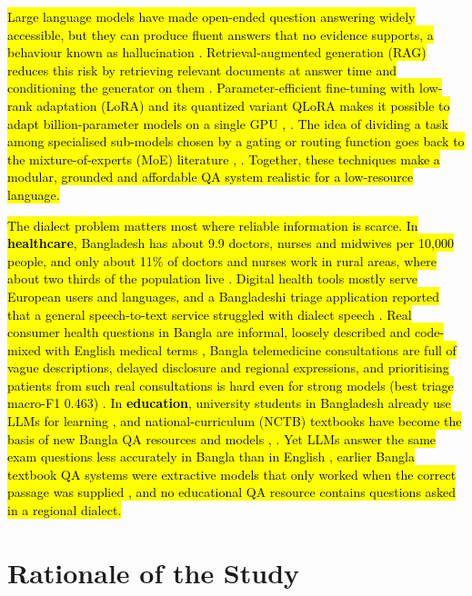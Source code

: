 \hl{Large language models have made open-ended question answering widely
accessible, but they can produce fluent answers that no evidence
supports, a behaviour known as hallucination \cite{ji2023survey}.
Retrieval-augmented generation (RAG) reduces this risk by retrieving
relevant documents at answer time and conditioning the generator on them
\cite{lewis2020rag}. Parameter-efficient fine-tuning with low-rank adaptation
(LoRA) and its quantized variant QLoRA makes it possible to adapt
billion-parameter models on a single GPU \cite{hu2022lora}, \cite{dettmers2023qlora}. The idea of
dividing a task among specialised sub-models chosen by a gating or
routing function goes back to the mixture-of-experts (MoE) literature
\cite{jacobs1991adaptive}, \cite{shazeer2017moe}. Together, these techniques make a modular, grounded
and affordable QA system realistic for a low-resource language.}

\hl{The dialect problem matters most where reliable information is
scarce. In \textbf{healthcare}, Bangladesh has about 9.9 doctors, nurses
and midwives per 10,000 people, and only about 11\% of doctors and
nurses work in rural areas, where about two thirds of the population
live \cite{nuruzzaman2022informing}. Digital health tools mostly serve European users and
languages, and a Bangladeshi triage application reported that a general
speech-to-text service struggled with dialect speech \cite{nahar2025amardoctor}. Real consumer
health questions in Bangla are informal, loosely described and
code-mixed with English medical terms \cite{khan2023nervous}, Bangla telemedicine
consultations are full of vague descriptions, delayed disclosure and
regional expressions, and prioritising patients from such real
consultations is hard even for strong models (best triage macro-F1
0.463) \cite{saha2026doctalkbn}. In \textbf{education}, university students in
Bangladesh already use LLMs for learning \cite{hossain2025ailiteracy}, and
national-curriculum (NCTB) textbooks have become the basis of new Bangla
QA resources and models \cite{raihan2025tigerllm}, \cite{nctbqa}. Yet LLMs answer the same
exam questions less accurately in Bangla than in English \cite{shafayat2024benqa},
earlier Bangla textbook QA systems were extractive models that only
worked when the correct passage was supplied \cite{khondoker2024unlocking}, and no
educational QA resource contains questions asked in a regional dialect.}

\section{Rationale of the Study}\label{rationale-of-the-study}


